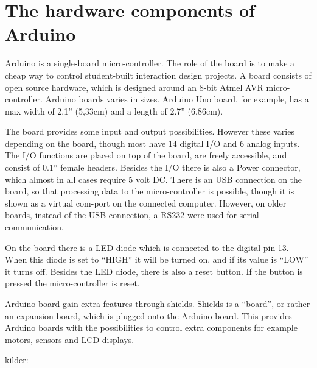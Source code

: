 \chapter{The hardware components of Arduino}
Arduino is a single-board micro-controller.
The role of the board is to make a cheap way to control student-built interaction design projects. A board consists of open source hardware, which is designed around an 8-bit Atmel AVR micro-controller. Arduino boards varies in sizes. Arduino Uno board, for example, has a max width of 2.1'' (5,33cm) and a length of 2.7'' (6,86cm). 

The board provides some input and output possibilities. However these varies depending on the board, though most have 14 digital I/O and 6 analog inputs. The I/O functions are placed on top of the board, are freely accessible, and consist of 0.1'' female headers. Besides the I/O there is also a Power connector, which almost in all cases require 5 volt DC. There is an USB connection on the board, so that processing data to the micro-controller is possible, though it is shown as a virtual com-port on the connected computer. However, on older boards, instead of the USB connection, a RS232 were used for serial communication. 

On the board there is a LED diode which is connected to the digital pin 13. When this diode is set to ``HIGH'' it will be turned on, and if its value is ``LOW'' it turns off. Besides the LED diode, there is also a reset button. If the button is pressed the micro-controller is reset. 

Arduino board gain extra features through shields. Shields is a ``board'', or rather an expansion board, which is plugged onto the Arduino board. This provides Arduino boards with the possibilities to control extra components for example motors, sensors and LCD displays.

kilder:
%
